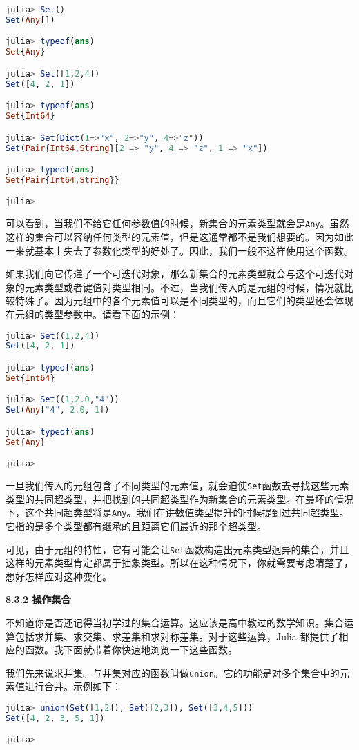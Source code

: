 \begin{lstlisting}[language=julia]
julia> Set()
Set(Any[])

julia> typeof(ans)
Set{Any}

julia> Set([1,2,4])
Set([4, 2, 1])

julia> typeof(ans)
Set{Int64}

julia> Set(Dict(1=>"x", 2=>"y", 4=>"z"))
Set(Pair{Int64,String}[2 => "y", 4 => "z", 1 => "x"])

julia> typeof(ans)
Set{Pair{Int64,String}}

julia> 
\end{lstlisting}

可以看到，当我们不给它任何参数值的时候，新集合的元素类型就会是\verb|Any|。虽然这样的集合可以容纳任何类型的元素值，但是这通常都不是我们想要的。因为如此一来就基本上失去了参数化类型的好处了。因此，我们一般不这样使用这个函数。

如果我们向它传递了一个可迭代对象，那么新集合的元素类型就会与这个可迭代对象的元素类型或者键值对类型相同。不过，当我们传入的是元组的时候，情况就比较特殊了。因为元组中的各个元素值可以是不同类型的，而且它们的类型还会体现在元组的类型参数中。请看下面的示例：

\begin{lstlisting}[language=julia]
julia> Set((1,2,4))
Set([4, 2, 1])

julia> typeof(ans)
Set{Int64}

julia> Set((1,2.0,"4"))
Set(Any["4", 2.0, 1])

julia> typeof(ans)
Set{Any}

julia> 
\end{lstlisting}

一旦我们传入的元组包含了不同类型的元素值，就会迫使\verb|Set|函数去寻找这些元素类型的共同超类型，并把找到的共同超类型作为新集合的元素类型。在最坏的情况下，这个共同超类型将是\verb|Any|。我们在讲数值类型提升的时候提到过共同超类型。它指的是多个类型都有继承的且距离它们最近的那个超类型。

可见，由于元组的特性，它有可能会让\verb|Set|函数构造出元素类型迥异的集合，并且这样的元素类型肯定都属于抽象类型。所以在这种情况下，你就需要考虑清楚了，想好怎样应对这种变化。

\textbf{8.3.2 操作集合}

不知道你是否还记得当初学过的集合运算。这应该是高中教过的数学知识。集合运算包括求并集、求交集、求差集和求对称差集。对于这些运算，Julia 都提供了相应的函数。我下面就带着你快速地浏览一下这些函数。

我们先来说求并集。与并集对应的函数叫做\verb|union|。它的功能是对多个集合中的元素值进行合并。示例如下：
\begin{lstlisting}[language=julia]
julia> union(Set([1,2]), Set([2,3]), Set([3,4,5]))
Set([4, 2, 3, 5, 1])

julia> 
\end{lstlisting}


